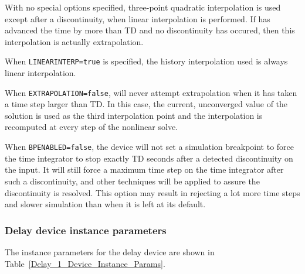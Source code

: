 \begin{Device}
With no special options specified, three-point quadratic interpolation
is used except after a discontinuity, when linear interpolation is
performed.  If \Xyce{} has advanced the time by more than TD and no
discontinuity has occured, then this interpolation is actually
extrapolation.

When \texttt{LINEARINTERP=true} is specified, the history
interpolation used is always linear interpolation.

When \texttt{EXTRAPOLATION=false}, \Xyce{} will never attempt
extrapolation when it has taken a time step larger than TD.  In this
case, the current, unconverged value of the solution is used as the
third interpolation point and the interpolation is recomputed at every
step of the nonlinear solve.

When \texttt{BPENABLED=false}, the device will not set a simulation
breakpoint to force the time integrator to stop exactly TD seconds
after a detected discontinuity on the input.  It will still force a
maximum time step on the time integrator after such a discontinuity,
and other techniques will be applied to assure the discontinuity is
resolved.  This option may result in \Xyce{} rejecting a lot more time
steps and slower simulation than when it is left at its default.

\end{Device}

\subsubsection{Delay device instance parameters}

The instance parameters for the delay device are shown in
Table~\ref{Delay_1_Device_Instance_Params}.


